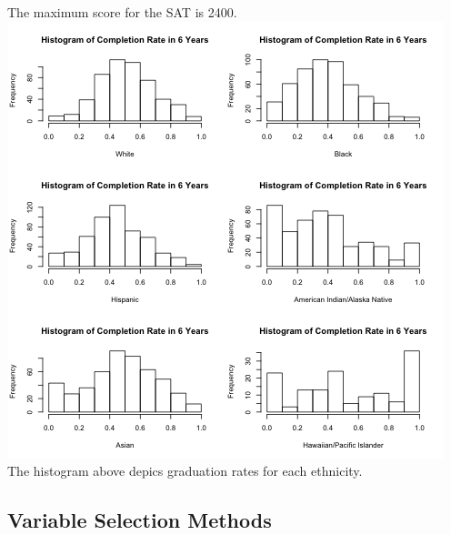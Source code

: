 \documentclass{article}
\begin{document}
The maximum score for the SAT is 2400.
\includegraphics{../../images/histogram_race_completion}
The histogram above depics graduation rates for each ethnicity. 

\subsection{Variable Selection Methods}
\end{document}
